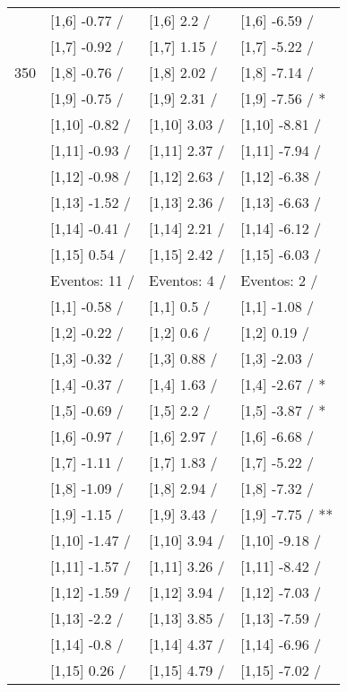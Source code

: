 \begin{table}
\begin{tabular}[t]{llll}
 & {}[1,6] -0.77  / & {}[1,6] 2.2  / & {}[1,6] -6.59  /\\
 & {}[1,7] -0.92  / & {}[1,7] 1.15  / & {}[1,7] -5.22  /\\
350 & {}[1,8] -0.76  / & {}[1,8] 2.02  / & {}[1,8] -7.14  /\\
\addlinespace
 & {}[1,9] -0.75  / & {}[1,9] 2.31  / & {}[1,9] -7.56  / *\\
 & {}[1,10] -0.82  / & {}[1,10] 3.03  / & {}[1,10] -8.81  /\\
 & {}[1,11] -0.93  / & {}[1,11] 2.37  / & {}[1,11] -7.94  /\\
 & {}[1,12] -0.98  / & {}[1,12] 2.63  / & {}[1,12] -6.38  /\\
 & {}[1,13] -1.52  / & {}[1,13] 2.36  / & {}[1,13] -6.63  /\\
\addlinespace
 & {}[1,14] -0.41  / & {}[1,14] 2.21  / & {}[1,14] -6.12  /\\
 & {}[1,15] 0.54  / & {}[1,15] 2.42  / & {}[1,15] -6.03  /\\
 & Eventos:  11 / & Eventos:  4 / & Eventos:  2 /\\
 & {}[1,1] -0.58  / & {}[1,1] 0.5  / & {}[1,1] -1.08  /\\
 & {}[1,2] -0.22  / & {}[1,2] 0.6  / & {}[1,2] 0.19  /\\
\addlinespace
 & {}[1,3] -0.32  / & {}[1,3] 0.88  / & {}[1,3] -2.03  /\\
 & {}[1,4] -0.37  / & {}[1,4] 1.63  / & {}[1,4] -2.67  / *\\
 & {}[1,5] -0.69  / & {}[1,5] 2.2  / & {}[1,5] -3.87  / *\\
 & {}[1,6] -0.97  / & {}[1,6] 2.97  / & {}[1,6] -6.68  /\\
 & {}[1,7] -1.11  / & {}[1,7] 1.83  / & {}[1,7] -5.22  /\\
\addlinespace
500 & {}[1,8] -1.09  / & {}[1,8] 2.94  / & {}[1,8] -7.32  /\\
 & {}[1,9] -1.15  / & {}[1,9] 3.43  / & {}[1,9] -7.75  / **\\
 & {}[1,10] -1.47  / & {}[1,10] 3.94  / & {}[1,10] -9.18  /\\
 & {}[1,11] -1.57  / & {}[1,11] 3.26  / & {}[1,11] -8.42  /\\
 & {}[1,12] -1.59  / & {}[1,12] 3.94  / & {}[1,12] -7.03  /\\
\addlinespace
 & {}[1,13] -2.2  / & {}[1,13] 3.85  / & {}[1,13] -7.59  /\\
 & {}[1,14] -0.8  / & {}[1,14] 4.37  / & {}[1,14] -6.96  /\\
 & {}[1,15] 0.26  / & {}[1,15] 4.79  / & {}[1,15] -7.02  /\\
\bottomrule
\end{tabular}
\end{table}

